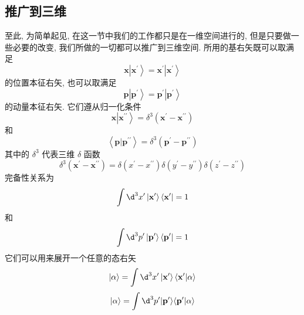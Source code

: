 \documentclass[lang=cn,newtx,10pt,scheme=chinese,thmcnt=section]{elegantbook}
\begin{document}
\subsection*{推广到三维}
至此, 为简单起见, 在这一节中我们的工作都只是在一维空间进行的, 但是只要做一些必要的改变, 我们所做的一切都可以推广到三维空间. 所用的基右矢既可以取满足
\begin{equation}
	\mathbf{x}\left| {\mathbf{x}}^{\prime }\right\rangle = {\mathbf{x}}^{\prime }\left| {\mathbf{x}}^{\prime }\right\rangle
\end{equation}
的位置本征右矢, 也可以取满足
\begin{equation}
	\mathbf{p}\left| {\mathbf{p}}^{\prime }\right\rangle = {\mathbf{p}}^{\prime }\left| {\mathbf{p}}^{\prime }\right\rangle
\end{equation}
的动量本征右矢. 它们遵从归一化条件
\begin{equation}
	\mathbf{x}\left| {\mathbf{x}}^{\prime \prime }\right\rangle = {\delta }^{3}\left( {{\mathbf{x}}^{\prime } - {\mathbf{x}}^{\prime \prime }}\right)
\end{equation}
和
\begin{equation}
	\left\langle {\mathbf{p} | {\mathbf{p}}^{\prime \prime }}\right\rangle = {\delta }^{3}\left( {{\mathbf{p}}^{\prime } - {\mathbf{p}}^{\prime \prime }}\right)
\end{equation}
其中的 ${\delta }^{3}$ 代表三维 $\delta$ 函数
\begin{equation}
	{\delta }^{3}\left( {{\mathbf{x}}^{\prime } - {\mathbf{x}}^{\prime \prime }}\right) = \delta \left( {{x}^{\prime } - {x}^{\prime \prime }}\right) \delta \left( {{y}^{\prime } - {y}^{\prime \prime }}\right) \delta \left( {{z}^{\prime } - {z}^{\prime \prime }}\right)
\end{equation}
完备性关系为
\begin{equation}
	\int {\d}^{3}{x}^{\prime }\left| {\mathbf{x}}^{\prime }\right\rangle \left\langle {\mathbf{x}}^{\prime }\right| = 1
\end{equation}
和
\begin{equation}
	\int {\d}^{3}{p}^{\prime }\left| {\mathbf{p}}^{\prime }\right\rangle \left\langle {\mathbf{p}}^{\prime }\right| = 1
\end{equation}
它们可以用来展开一个任意的态右矢
\begin{equation}
	|\alpha \rangle = \int {\d}^{3}{x}^{\prime }\left| {\mathbf{x}}^{\prime }\right\rangle \left\langle {{\mathbf{x}}^{\prime } | \alpha }\right\rangle
\end{equation}
\begin{equation}
	| {\alpha \rangle = \int {\d}^{3}{p}^{\prime }}| {\mathbf{p}}^{\prime }\rangle \langle {{\mathbf{p}}^{\prime } | \alpha }\rangle
\end{equation}
\end{document}
